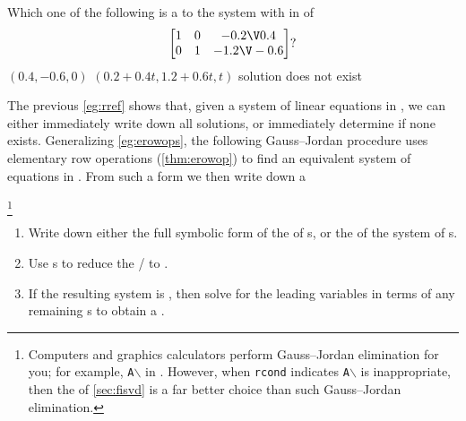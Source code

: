 \begin{activity}
Which one of the following is a  to the system with  in  of
\begin{equation*}
\begin{bmatrix} 1&0&-0.2\V0.4
\\0&1&-1.2\V-0.6 \end{bmatrix}?
\end{equation*}
{\((0.4,-0.6,0)\)}
{\((0.2+0.4t,1.2+0.6t,t)\)}
{solution does not exist}
\end{activity}



The previous \cref{eg:rref} shows that, given a system of linear equations in , we can either immediately write down all solutions, or immediately determine if none exists.
Generalizing \cref{eg:erowops}, the following Gauss--Jordan procedure uses elementary row operations (\cref{thm:erowop}) to find an equivalent system of equations in . 
From such a form we then write down a 




\begin{procedure}\label{pro:gje}%
\hspace*{-2em}\footnote{Computers and graphics calculators perform Gauss--Jordan elimination for you; for example, \texttt{A$\backslash$} in \script. 
However, when \texttt{rcond} indicates \texttt{A$\backslash$} is inappropriate, then the  of \cref{sec:fisvd} is a far better choice than such Gauss--Jordan elimination.}
\begin{enumerate}
\item Write down either the full symbolic form of the  of s, or the  of the system of s.
\item Use s to reduce the \slash{} to .
\item If the resulting system is , then solve for the leading variables in terms of any remaining s to obtain a .
\end{enumerate}
\end{procedure}



